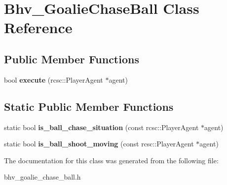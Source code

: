 \hypertarget{classBhv__GoalieChaseBall}{
\section{Bhv\_\-GoalieChaseBall Class Reference}
\label{classBhv__GoalieChaseBall}
}
\subsection*{Public Member Functions}
\begin{DoxyCompactItemize}
\item 
\hypertarget{classBhv__GoalieChaseBall_a98e8c5be7c11fd8fcef6e0842e3311cb}{
bool {\bfseries execute} (rcsc::PlayerAgent $\ast$agent)}
\label{classBhv__GoalieChaseBall_a98e8c5be7c11fd8fcef6e0842e3311cb}

\end{DoxyCompactItemize}
\subsection*{Static Public Member Functions}
\begin{DoxyCompactItemize}
\item 
\hypertarget{classBhv__GoalieChaseBall_a72fa18e876dc2db73062bff6545eb6be}{
static bool {\bfseries is\_\-ball\_\-chase\_\-situation} (const rcsc::PlayerAgent $\ast$agent)}
\label{classBhv__GoalieChaseBall_a72fa18e876dc2db73062bff6545eb6be}

\item 
\hypertarget{classBhv__GoalieChaseBall_a5443dd7695d7113b6b68a60a238c5566}{
static bool {\bfseries is\_\-ball\_\-shoot\_\-moving} (const rcsc::PlayerAgent $\ast$agent)}
\label{classBhv__GoalieChaseBall_a5443dd7695d7113b6b68a60a238c5566}

\end{DoxyCompactItemize}


The documentation for this class was generated from the following file:\begin{DoxyCompactItemize}
\item 
bhv\_\-goalie\_\-chase\_\-ball.h\end{DoxyCompactItemize}

